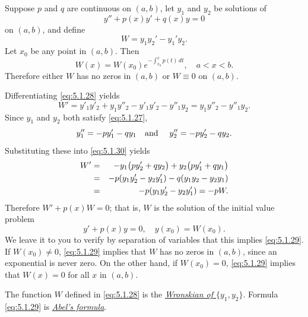 \begin{theorem}
  \color{blue}
  \label{thmtype:5.1.4} Suppose $p$ and $q$ are continuous on $(a,b)$, let $y_{1}$ and $y_{2}$ be
  solutions of
  \begin{equation}
    \label{eq:5.1.27}y''+p(x)y'+q(x)y=0
  \end{equation}
  on $(a,b)$, and define
  \begin{equation}
    \label{eq:5.1.28}W=y_{1}y_{2}'-y_{1}'y_{2}.
  \end{equation}
  Let $x_{0}$ be any point in $(a,b)$. Then
  \begin{equation}
    \label{eq:5.1.29}W(x)=W(x_{0})e^{-\int^{x}_{x_{0}}p(t)\, dt},\quad a<x<b.
  \end{equation}
  Therefore either $W$ has no zeros in $(a,b)$ or $W\equiv0$ on $(a,b)$.
\end{theorem}

\proof Differentiating \eqref{eq:5.1.28} yields
\begin{equation}
  \label{eq:5.1.30}W'=y'_{1}y'_{2}+y_{1}y''_{2}-y'_{1}y'_{2}-y''_{1}y_{2}= y_{1}y''_{2}-y''_{1}y_{2}.
\end{equation}
Since $y_{1}$ and $y_{2}$ both satisfy \eqref{eq:5.1.27},
\[
  y''_{1}=-py'_{1}-qy_{1}\mbox{\quad and \quad}y''_{2}=-py'_{2}-qy_{2}.
\]
Substituting these into \eqref{eq:5.1.30} yields
\begin{eqnarray*}
  W' & = & \displaystyle-y_{1}\bigl(py'_{2}+qy_{2}\bigr)+y_{2}\bigl(py'_{1}+qy_{1}\bigr) \\
     & = & \displaystyle-p(y_{1}y'_{2}-y_{2}y'_{1})-q(y_{1}y_{2}-y_{2}y_{1})             \\
     & = & -p(y_{1}y'_{2}-y_{2}y'_{1})=-pW.
\end{eqnarray*}
Therefore $W'+p(x)W=0$; that is, $W$ is the solution of the initial value problem
\[
  y'+p(x)y=0,\quad y(x_{0})=W(x_{0}).
\]
We leave it to you to verify by separation of variables that this implies \eqref{eq:5.1.29}. If
$W(x_{0})\ne0$, \eqref{eq:5.1.29} implies that $W$ has no zeros in $(a,b)$, since an exponential is
never zero. On the other hand, if $W(x_{0})=0$, \eqref{eq:5.1.29} implies that $W(x)=0$ for all $x$
in $(a,b)$.\bbox

The function $W$ defined in \eqref{eq:5.1.28} is the
\href{https://mathshistory.st-andrews.ac.uk/Biographies/Wronski/}{\color{blue}
\it Wronskian of $\{y_{1},y_{2}\}$}. Formula \eqref{eq:5.1.29} is
\href{https://mathshistory.st-andrews.ac.uk/Biographies/Abel/}{\color{blue}
\it Abel's formula}.

